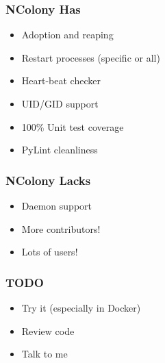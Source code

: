 \documentclass{beamer}
\begin{document}
\begin{frame}[fragile]
\frametitle{NColony Has}
\begin{itemize}
\item Adoption and reaping \pause
\item Restart processes (specific or all) \pause
\item Heart-beat checker \pause
\item UID/GID support \pause
\item 100\% Unit test coverage \pause
\item PyLint cleanliness
\end{itemize}
\end{frame}

\begin{frame}[fragile]
\frametitle{NColony Lacks}
\begin{itemize}
\item Daemon support \pause
\item More contributors! \pause
\item Lots of users!
\end{itemize}
\end{frame}

\begin{frame}[fragile]
\frametitle{TODO}
\begin{itemize}
\item Try it (especially in Docker) \pause
\item Review code \pause
\item Talk to me
\end{itemize}
\end{frame}
\end{document}
